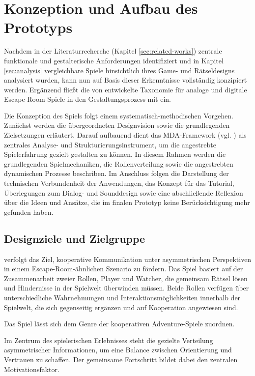 \chapter{Konzeption und Aufbau des Prototyps}\label{sec:concept}
Nachdem in der Literaturrecherche (Kapitel \ref{sec:related-works}) zentrale funktionale und gestalterische Anforderungen identifiziert und in Kapitel \ref{sec:analysis} vergleichbare Spiele hinsichtlich ihres Game- und Rätseldesigns analysiert wurden, kann  nun auf Basis dieser Erkenntnisse vollständig konzipiert werden. Ergänzend fließt die von \cite{krekhov_puzzles_2021} entwickelte Taxonomie für analoge und digitale Escape-Room-Spiele in den Gestaltungsprozess mit ein.

Die Konzeption des Spiels folgt einem systematisch-methodischen Vorgehen. Zunächst werden die übergeordneten Designvision sowie die grundlegenden Zielsetzungen erläutert. Darauf aufbauend dient das \ac{MDA}-Framework (vgl. \citealp{hunicke_mda_2004}) als zentrales Analyse- und Strukturierungsinstrument, um die angestrebte Spielerfahrung gezielt gestalten zu können. In diesem Rahmen werden die grundlegenden Spielmechaniken, die Rollenverteilung sowie die angestrebten dynamischen Prozesse beschriben. Im Anschluss folgen die Darstellung der technischen Verbundenheit der Anwendungen, das Konzept für das Tutorial, Überlegungen zum Dialog- und Sounddesign sowie eine abschließende Reflexion über die Ideen und Ansätze, die im finalen Prototyp keine Berücksichtigung mehr gefunden haben.

\section{Designziele und Zielgruppe}
 verfolgt das Ziel, kooperative Kommunikation unter asymmetrischen Perspektiven in einem Escape-Room-ähnlichen Szenario zu fördern. Das Spiel basiert auf der Zusammenarbeit zweier Rollen, Player und Watcher, die gemeinsam Rätsel lösen und Hindernisse in der Spielwelt überwinden müssen. Beide Rollen verfügen über unterschiedliche Wahrnehmungen und Interaktionsmöglichkeiten innerhalb der Spielwelt, die sich gegenseitig ergänzen und auf Kooperation angewiesen sind.

Das Spiel lässt sich dem Genre der kooperativen Adventure-Spiele zuordnen.

Im Zentrum des spielerischen Erlebnisses steht die gezielte Verteilung asymmetrischer Informationen, um eine Balance zwischen Orientierung und Vertrauen zu schaffen. Der gemeinsame Fortschritt bildet dabei den zentralen Motivationsfaktor.

